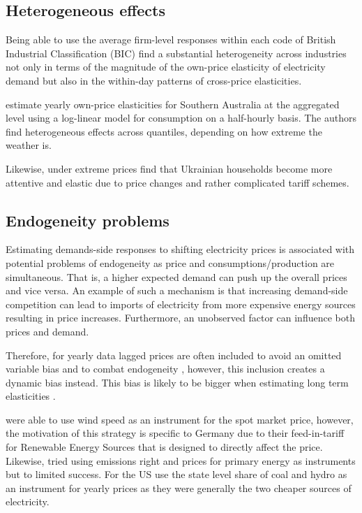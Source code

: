 \subsection{Heterogeneous effects}
\label{subsec:b_heterogeneity}
Being able to use the average firm-level responses within each code of British Industrial Classification (BIC) \citet{patrick2001estimating} find a substantial heterogeneity across industries not only in terms of the magnitude of the own-price elasticity of electricity demand but also in the within-day patterns of cross-price elasticities. %
\par
\citet{fan2011price} estimate yearly own-price elasticities for Southern Australia at the aggregated level using a log-linear model for consumption on a half-hourly basis. The authors find heterogeneous effects across quantiles, depending on how extreme the weather is.
\par
Likewise, under extreme prices \citet{alberini2019response} find that Ukrainian households become more attentive and elastic due to price changes and rather complicated tariff schemes.

\subsection{Endogeneity problems}
\label{subsec:b_endogeneity}
Estimating demands-side responses to shifting electricity prices is associated with potential problems of endogeneity as price and consumptions/production are simultaneous. That is, a higher expected demand can push up the overall prices and vice versa. An example of such a mechanism is that increasing demand-side competition can lead to imports of electricity from more expensive energy sources \citep{burke2017price} resulting in price increases. Furthermore, an unobserved factor can influence both prices and demand.
\par
Therefore, for yearly data lagged prices are often included to avoid an omitted variable bias and to combat endogeneity \citep{lijesen2007real}, however, this inclusion creates a dynamic bias instead. This bias is likely to be bigger when estimating long term elasticities \citep{okajima2013estimation}. %
\bigskip\par
\citet{bonte2015price} were able to use wind speed as an instrument for the spot market price, however, the motivation of this strategy is specific to Germany due to their feed-in-tariff for Renewable Energy Sources that is designed to directly affect the price. Likewise, \citet{graf2013measuring} tried using emissions right and prices for primary energy as instruments but to limited success. For the US \citet{burke2017price} use the state level share of coal and hydro as an instrument for yearly prices as they were generally the two cheaper sources of electricity.

